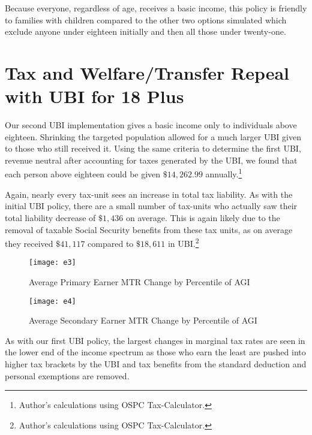 \documentclass{article}
\newcommand{\ospc}{\footnote{Author’s calculations using OSPC Tax-Calculator.}}
\begin{document}
Because everyone, regardless of age, receives a basic income, this policy is friendly to families with children compared to the other two options simulated which exclude anyone under eighteen initially and then all those under twenty-one.

\section{Tax and Welfare/Transfer Repeal with UBI for 18 Plus}
Our second UBI implementation gives a basic income only to individuals above eighteen. Shrinking the targeted population allowed for a much larger UBI given to those who still received it. Using the same criteria to determine the first UBI, revenue neutral after accounting for taxes generated by the UBI, we found that each person above eighteen could be given $\$14,262.99$ annually.\ospc

Again, nearly every tax-unit sees an increase in total tax liability. As with the initial UBI policy, there are a small number of tax-units who actually saw their total liability decrease of $\$1,436$ on average. This is again likely due to the removal of taxable Social Security benefits from these tax units, as on average they received $\$41,117$ compared to $\$18,611$ in UBI.\ospc

\begin{figure}[H]
\centering
\caption{Average Primary Earner MTR Change by Percentile of AGI}
\texttt{[image: e3]}
\end{figure}

\begin{figure}[H]
\centering
\caption{Average Secondary Earner MTR Change by Percentile of AGI}
\texttt{[image: e4]}
\end{figure}

As with our first UBI policy, the largest changes in marginal tax rates are seen in the lower end of the income spectrum as those who earn the least are pushed into higher tax brackets by the UBI and tax benefits from the standard deduction and personal exemptions are removed.

\begin{table}[H]
\caption{Increase in Tax Liabilities by Percentile of AGI}
\begin{center}
\begin{adjustbox}{max width=\textwidth}

\end{adjustbox}
\end{center}
\end{table}
\end{document}
